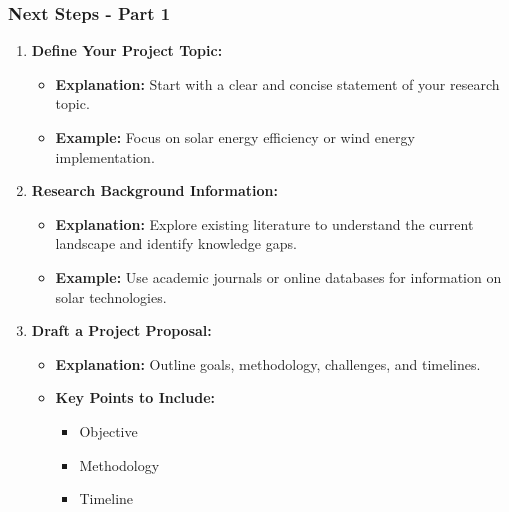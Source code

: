 \documentclass[aspectratio=169]{beamer}
\begin{document}
\begin{frame}[fragile]
    \frametitle{Next Steps - Part 1}
    \begin{enumerate}
        \item \textbf{Define Your Project Topic:}
        \begin{itemize}
            \item \textbf{Explanation:} Start with a clear and concise statement of your research topic.
            \item \textbf{Example:} Focus on solar energy efficiency or wind energy implementation.
        \end{itemize}
        
        \item \textbf{Research Background Information:}
        \begin{itemize}
            \item \textbf{Explanation:} Explore existing literature to understand the current landscape and identify knowledge gaps.
            \item \textbf{Example:} Use academic journals or online databases for information on solar technologies.
        \end{itemize}
        
        \item \textbf{Draft a Project Proposal:}
        \begin{itemize}
            \item \textbf{Explanation:} Outline goals, methodology, challenges, and timelines.
            \item \textbf{Key Points to Include:}
                \begin{itemize}
                    \item Objective
                    \item Methodology
                    \item Timeline
                \end{itemize}
        \end{itemize}
    \end{enumerate}
\end{frame}
\end{document}
